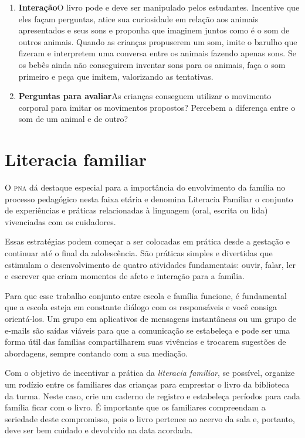 \documentclass[11pt]{extarticle}
\begin{document}
\begin{enumerate}
\item \textbf{Interação}\quad O livro pode e deve ser 
manipulado pelos estudantes. Incentive que eles façam perguntas, atice sua curiosidade em relação aos animais apresentados e seus sons e proponha que imaginem juntos como é o som 
de outros animais. Quando as crianças propuserem um som, imite o barulho que 
fizeram e interpretem uma conversa entre os animais fazendo apenas 
sons. Se os bebês ainda não conseguirem inventar sons para os animais, faça 
o som primeiro e peça que imitem, valorizando as tentativas.

\item \textbf{Perguntas para avaliar}\quad As crianças conseguem utilizar o movimento corporal para imitar os movimentos propostos? Percebem a diferença entre o som de um animal e de outro? 
\end{enumerate}


\section{Literacia familiar}
O \textsc{pna} dá destaque especial para a importância do envolvimento da família 
no processo pedagógico nesta faixa etária e denomina Literacia Familiar o conjunto 
de experiências e práticas relacionadas à linguagem (oral, escrita ou lida) vivenciadas 
com os cuidadores. 

Essas estratégias podem começar a ser colocadas em prática desde a 
gestação e continuar até o final da adolescência. São práticas simples e divertidas 
que estimulam o desenvolvimento de quatro atividades fundamentais: ouvir, falar, 
ler e escrever que criam momentos de afeto e interação para a família. 

Para que esse trabalho conjunto entre escola e família funcione, é 
fundamental que a escola esteja em constante diálogo com os responsáveis e 
você consiga orientá-los. Um grupo em aplicativos de mensagens instantâneas ou um 
grupo de e-mails são saídas viáveis para que a comunicação se estabeleça e pode ser 
uma forma útil das famílias compartilharem suas vivências e trocarem sugestões 
de abordagens, sempre contando com a sua mediação. 

Com o objetivo de incentivar 
a prática da \textit{literacia familiar}, se possível, organize um rodízio entre os familiares 
das crianças para emprestar o livro da biblioteca da turma. Neste caso, crie um caderno 
de registro e estabeleça períodos para cada família ficar com o livro. É importante 
que os familiares compreendam a seriedade deste compromisso, pois o livro pertence 
ao acervo da sala e, portanto, deve ser bem cuidado e devolvido na data acordada. 
\end{document}

